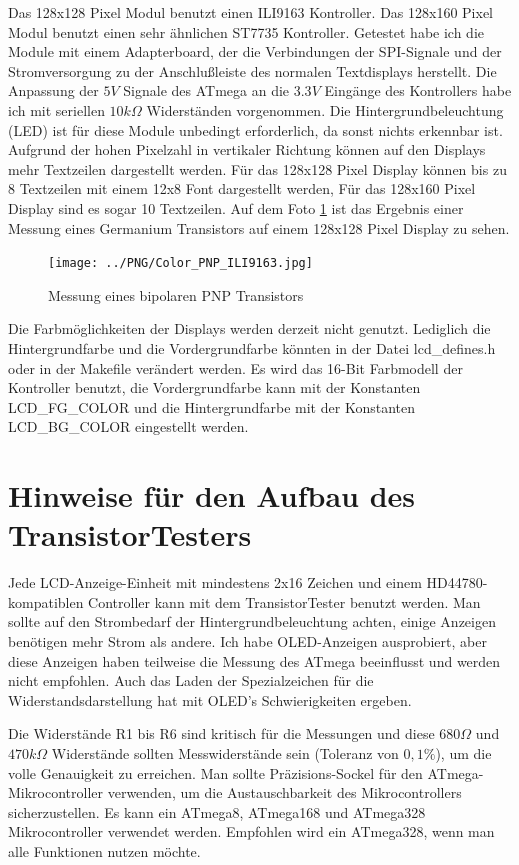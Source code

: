 Das 128x128 Pixel Modul benutzt einen ILI9163 Kontroller.
Das 128x160 Pixel Modul benutzt einen sehr ähnlichen ST7735 Kontroller.
Getestet habe ich die Module mit einem Adapterboard, der die Verbindungen
der SPI-Signale und der Stromversorgung zu der Anschlußleiste des normalen Textdisplays
herstellt. Die Anpassung der \(5V\) Signale des ATmega an die \(3.3V\) Eingänge des Kontrollers
habe ich mit seriellen \(10k\Omega\) Widerständen vorgenommen.
Die Hintergrundbeleuchtung (LED) ist für diese Module unbedingt erforderlich, da sonst
nichts erkennbar ist.
Aufgrund der hohen Pixelzahl in vertikaler Richtung können auf den Displays mehr Textzeilen dargestellt
werden. Für das 128x128 Pixel Display können bis zu 8 Textzeilen mit einem 12x8 Font dargestellt werden,
Für das 128x160 Pixel Display sind es sogar 10 Textzeilen.
Auf dem Foto \ref{fig:Color_PNP} ist das Ergebnis einer Messung eines Germanium Transistors auf einem
128x128 Pixel Display zu sehen.

\begin{figure}[H]
\centering
\texttt{[image: ../PNG/Color\_PNP\_ILI9163.jpg]}	%
\caption{Messung eines bipolaren PNP Transistors}
\label{fig:Color_PNP}
\end{figure}

Die Farbmöglichkeiten der Displays werden derzeit nicht genutzt. Lediglich die Hintergrundfarbe
und die Vordergrundfarbe könnten in der Datei lcd\_defines.h oder in der Makefile verändert werden.
Es wird das 16-Bit Farbmodell der Kontroller benutzt, die Vordergrundfarbe kann mit der Konstanten
LCD\_FG\_COLOR und die Hintergrundfarbe mit der Konstanten LCD\_BG\_COLOR eingestellt werden.

\section{Hinweise für den Aufbau des TransistorTesters}
Jede LCD-Anzeige-Einheit mit mindestens 2x16 Zeichen und einem HD44780-kompatiblen Controller kann mit
dem TransistorTester benutzt werden.
Man sollte auf den Strombedarf der Hintergrundbeleuchtung achten, einige Anzeigen benötigen
mehr Strom als andere.
Ich habe OLED-Anzeigen ausprobiert, aber diese Anzeigen haben teilweise die Messung des
ATmega beeinflusst und werden nicht empfohlen. Auch das Laden der Spezialzeichen für die 
Widerstandsdarstellung hat mit OLED's Schwierigkeiten ergeben.

Die Widerstände R1 bis R6 sind kritisch für die Messungen und diese \(680\Omega\) und
\(470k\Omega\) Widerstände sollten Messwiderstände sein (Toleranz von \(0,1\%\)), um 
die volle Genauigkeit zu erreichen.
Man sollte Präzisions-Sockel für den ATmega-Mikrocontroller verwenden, um
die Austauschbarkeit des Mikrocontrollers sicherzustellen.
Es kann ein ATmega8, ATmega168 und ATmega328 Mikrocontroller verwendet werden.
Empfohlen wird ein ATmega328, wenn man alle Funktionen nutzen möchte.

